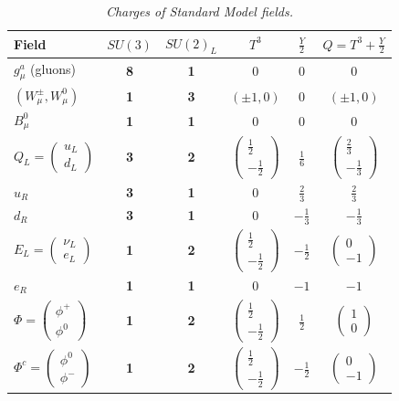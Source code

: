 \documentclass[12pt]{article}
\def\vector#1#2{\left( \begin{array}{c}#1\\ #2\end{array}\right)}
\begin{document}
\begin{table}
\begin{center}
\begin{tabular}{lccccc}
\hline\hline
Field & $SU(3)$ & $SU(2)_L$ & $T^3$ & $\frac{Y}{2}$ & $Q=T^3+\frac{Y}{2}$ \\
\hline
$g_\mu^a$ (gluons) & {\bf 8} & {\bf 1} & 0 & 0 & 0 \\
$(W_\mu^\pm, W_\mu^0)$ & {\bf 1} & {\bf 3} & $(\pm 1,0)$ &  0 &   $(\pm 1,0)$ \\
$B^0_\mu$  & {\bf 1} & {\bf 1} &  0 & 0 & 0 \\
\hline
$Q_L=\vector{u_L}{d_L}$ & {\bf 3} & {\bf 2} & $\vector{\frac{1}{2}}{-\frac{1}{2}}$ & $\frac{1}{6}$ & $\vector{\frac{2}{3}}{-\frac{1}{3}}$ \\
$u_R$ & {\bf 3} & {\bf 1} & 0 & $\frac{2}{3}$ & $\frac{2}{3}$ \\
$d_R$ & {\bf 3} & {\bf 1}& 0 & $-\frac{1}{3}$ & $-\frac{1}{3}$ \\
$E_L=\vector{\nu_L}{e_L}$ & {\bf 1} & {\bf 2}& $\vector{\frac{1}{2}}{-\frac{1}{2}}$ & $-\frac{1}{2}$ & $\vector{0}{-1}$ \\
$e_R$ & {\bf 1} & {\bf 1}& 0 & $-1$ & $-1$ \\ 
\hline
$\Phi=\vector{\phi^+}{\phi^0}$  & {\bf 1} & {\bf 2} & $\vector{\frac{1}{2}}{-\frac{1}{2}}$ &  $\frac{1}{2}$ & $\vector{1}{0}$ \\
$\Phi^c=\vector{\phi^0}{\phi^-}$  & {\bf 1} & {\bf 2}& $\vector{\frac{1}{2}}{-\frac{1}{2}}$ & $-\frac{1}{2}$ & $\vector{0}{-1}$ \\
\hline
\hline
\end{tabular}
\end{center}
\caption{\em Charges of Standard Model fields. \label{table:charges}}
\end{table}
\end{document}
